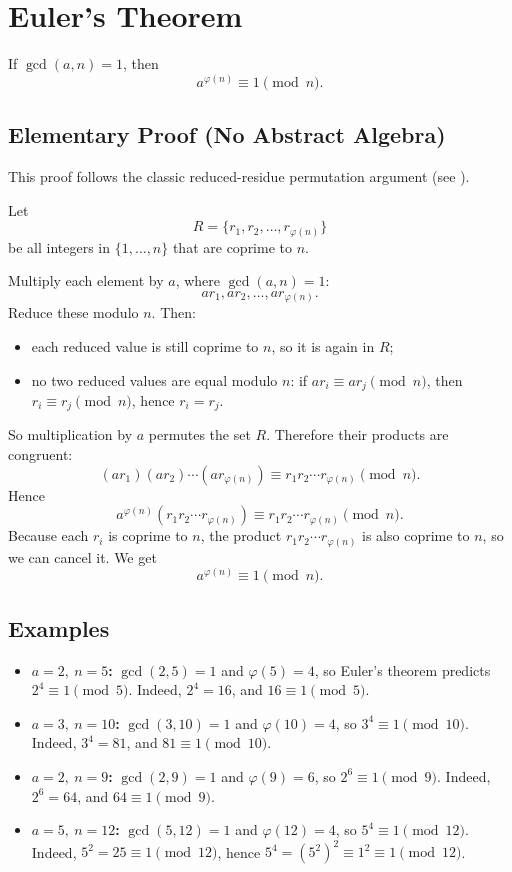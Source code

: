 \section{Euler's Theorem}
If \(\gcd(a,n)=1\), then
\[
  a^{\varphi(n)} \equiv 1 \pmod n.
\]

\subsection*{Elementary Proof (No Abstract Algebra)}
This proof follows the classic reduced-residue permutation argument (see
\cite{mse:euler-theorem-no-abstract-algebra}).

Let
\[
  R=\{r_1,r_2,\dots,r_{\varphi(n)}\}
\]
be all integers in \(\{1,\dots,n\}\) that are coprime to \(n\).

Multiply each element by \(a\), where \(\gcd(a,n)=1\):
\[
  ar_1,ar_2,\dots,ar_{\varphi(n)}.
\]
Reduce these modulo \(n\).  Then:
\begin{itemize}
  \item each reduced value is still coprime to \(n\), so it is again in \(R\);
  \item no two reduced values are equal modulo \(n\): if
        \(ar_i\equiv ar_j\pmod n\), then \(r_i\equiv r_j\pmod n\), hence
        \(r_i=r_j\).
\end{itemize}

So multiplication by \(a\) permutes the set \(R\).  Therefore their products are
congruent:
\[
  (ar_1)(ar_2)\cdots(ar_{\varphi(n)})
  \equiv
  r_1r_2\cdots r_{\varphi(n)}
  \pmod n.
\]
Hence
\[
  a^{\varphi(n)}(r_1r_2\cdots r_{\varphi(n)})
  \equiv
  r_1r_2\cdots r_{\varphi(n)}
  \pmod n.
\]
Because each \(r_i\) is coprime to \(n\), the product
\(r_1r_2\cdots r_{\varphi(n)}\) is also coprime to \(n\), so we can cancel it.
We get
\[
  a^{\varphi(n)} \equiv 1 \pmod n.
\]

\subsection*{Examples}
\begin{itemize}
  \item \textbf{\(a=2,\ n=5\):} \(\gcd(2,5)=1\) and \(\varphi(5)=4\), so Euler's theorem predicts
        \(2^4\equiv 1 \pmod 5\).  Indeed, \(2^4=16\), and \(16\equiv 1 \pmod 5\).

  \item \textbf{\(a=3,\ n=10\):} \(\gcd(3,10)=1\) and \(\varphi(10)=4\), so
        \(3^4\equiv 1 \pmod{10}\).  Indeed, \(3^4=81\), and
        \(81\equiv 1 \pmod{10}\).

  \item \textbf{\(a=2,\ n=9\):} \(\gcd(2,9)=1\) and \(\varphi(9)=6\), so
        \(2^6\equiv 1 \pmod 9\).  Indeed, \(2^6=64\), and \(64\equiv 1 \pmod 9\).

  \item \textbf{\(a=5,\ n=12\):} \(\gcd(5,12)=1\) and \(\varphi(12)=4\), so
        \(5^4\equiv 1 \pmod{12}\).  Indeed, \(5^2=25\equiv 1 \pmod{12}\), hence
        \(5^4=(5^2)^2\equiv 1^2\equiv 1 \pmod{12}\).
\end{itemize}

